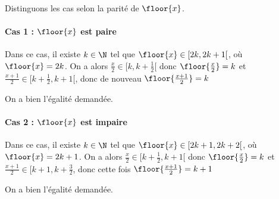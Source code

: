 
\begin{correction}
Distinguons les cas selon la parité de $\floor{x}$. 
\paragraph{Cas 1 : $\floor{x}$ est paire}
Dans ce cas, il existe $k\in \N$ tel que $\floor{x} \in [2k,2k+1[$, où $\floor{x}=2k$. On a alors 
$\frac{x}{2}\in [k,k+\frac{1}{2}[$ donc $\floor{\frac{x}{2}} =k$
et $\frac{x+1}{2 }\in [k+\frac{1}{2}, k+1[$, donc de nouveau $\floor{\frac{x+1}{2 }}=k$

On a bien l'égalité demandée. 

\paragraph{Cas 2 : $\floor{x}$ est impaire}
Dans ce cas, il existe $k\in \N$ tel que $\floor{x} \in [2k+1,2k+2[$, où $\floor{x}=2k+1$.  On a alors 
$\frac{x}{2}\in [k+\frac{1}{2},k+1[$ donc $\floor{\frac{x}{2}} =k$
et $\frac{x+1}{2 }\in [k+1, k+\frac{3}{2}$, donc cette fois $\floor{\frac{x+1}{2 }}=k+1$

On a bien l'égalité demandée. 


\end{correction}
